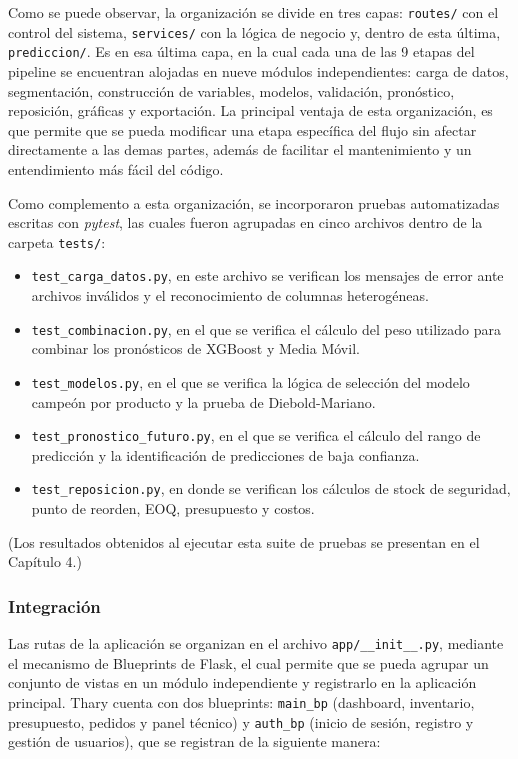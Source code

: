 Como se puede observar, la organización se divide en tres capas: \texttt{routes/} con el control del sistema, \texttt{services/} con la lógica de negocio y, dentro de esta última, \texttt{prediccion/}. Es en esa última capa, en la cual cada una de las 9 etapas del pipeline se encuentran alojadas en nueve módulos independientes: carga de datos, segmentación, construcción de variables, modelos, validación, pronóstico, reposición, gráficas y exportación. La principal ventaja de esta organización, es que permite que se pueda modificar una etapa específica del flujo sin afectar directamente a las demas partes, además de facilitar el mantenimiento y un entendimiento más fácil del código.

Como complemento a esta organización, se incorporaron pruebas automatizadas escritas con \textit{pytest}, las cuales fueron agrupadas en cinco archivos dentro de la carpeta \texttt{tests/}:

\begin{itemize}
    \item \texttt{test\_carga\_datos.py}, en este archivo se verifican los mensajes de error ante archivos inválidos y el reconocimiento de columnas heterogéneas.
    \item \texttt{test\_combinacion.py}, en el que se verifica el cálculo del peso utilizado para combinar los pronósticos de XGBoost y Media Móvil.
    \item \texttt{test\_modelos.py}, en el que se verifica la lógica de selección del modelo campeón por producto y la prueba de Diebold-Mariano.
    \item \texttt{test\_pronostico\_futuro.py}, en el que se verifica el cálculo del rango de predicción y la identificación de predicciones de baja confianza.
    \item \texttt{test\_reposicion.py}, en donde se verifican los cálculos de stock de seguridad, punto de reorden, EOQ, presupuesto y costos.
\end{itemize}

(Los resultados obtenidos al ejecutar esta suite de pruebas se presentan en el Capítulo 4.)

\subsubsection{Integración}

Las rutas de la aplicación se organizan en el archivo \texttt{app/\_\_init\_\_.py}, mediante el mecanismo de Blueprints de Flask, el cual permite que se pueda agrupar un conjunto de vistas en un módulo independiente y registrarlo en la aplicación principal. Thary cuenta con dos blueprints: \texttt{main\_bp} (dashboard, inventario, presupuesto, pedidos y panel técnico) y \texttt{auth\_bp} (inicio de sesión, registro y gestión de usuarios), que se registran de la siguiente manera:

